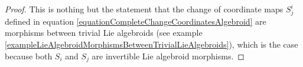 \begin{proof}
This is nothing but the statement that the change of coordinate maps $S^i_j$ defined in equation \eqref{equationCompleteChangeCoordinatesAlgebroid} are morphisms between trivial Lie algebroids (see example \ref{exampleLieAlgebroidMorphismsBetweenTrivialLieAlgebroids}), which is the case because both $S_i$ and $S_j$ are invertible Lie algebroid morphisms.
\end{proof}





